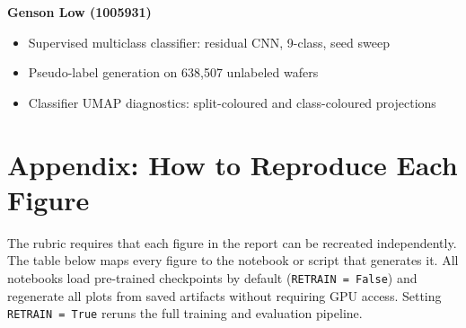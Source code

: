 \documentclass[11pt]{article}
\begin{document}
\textbf{Genson Low (1005931)}
\begin{itemize}[leftmargin=1.5em]
  \item Supervised multiclass classifier: residual CNN, 9-class, seed sweep
  \item Pseudo-label generation on 638,507 unlabeled wafers
  \item Classifier UMAP diagnostics: split-coloured and class-coloured projections
\end{itemize}

\newpage
\section{Appendix: How to Reproduce Each Figure}
\label{app:figures}

The rubric requires that each figure in the report can be recreated independently.
The table below maps every figure to the notebook or script that generates it.
All notebooks load pre-trained checkpoints by default (\texttt{RETRAIN = False})
and regenerate all plots from saved artifacts without requiring GPU access.
Setting \texttt{RETRAIN = True} reruns the full training and evaluation pipeline.
\end{document}
